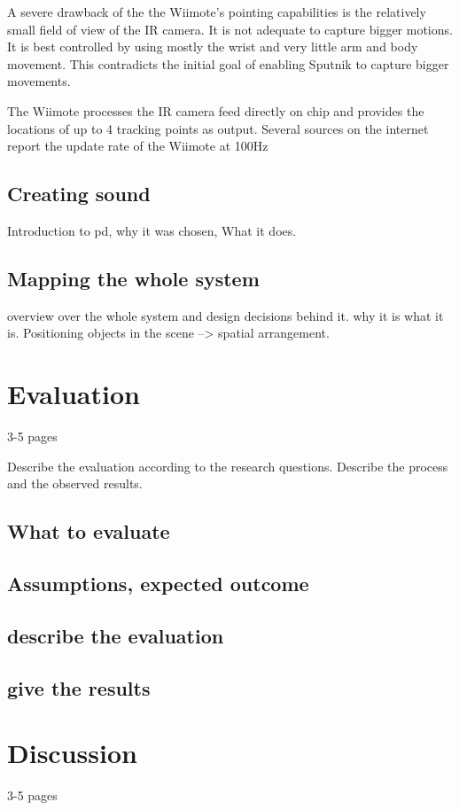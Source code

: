 \documentclass[10pt,a4paper]{scrartcl}
\begin{document}
A severe drawback of the the Wiimote's pointing capabilities is the relatively small field of view of the IR camera. It is not adequate to capture bigger motions. It is best controlled by using mostly the wrist and very little arm and body movement. This contradicts the initial goal of enabling Sputnik to capture bigger movements.

The Wiimote processes the IR camera feed directly on chip and provides the locations of up to 4 tracking points as output. Several sources on the internet report the update rate of the Wiimote at 100Hz


\subsection{Creating sound}
Introduction to pd, why it was chosen, What it does.

\subsection{Mapping the whole system}
overview over the whole system and design decisions behind it. why it is what it is.
Positioning objects in the scene --> spatial arrangement.


\section{Evaluation}
\label{sec:evaluation}
3-5 pages

Describe the evaluation according to the research questions. Describe the process and the observed results.

\subsection{What to evaluate}
\subsection{Assumptions, expected outcome}
\subsection{describe the evaluation}
\subsection{give the results}


\section{Discussion}
\label{sec:discussion}
3-5 pages
\end{document}

